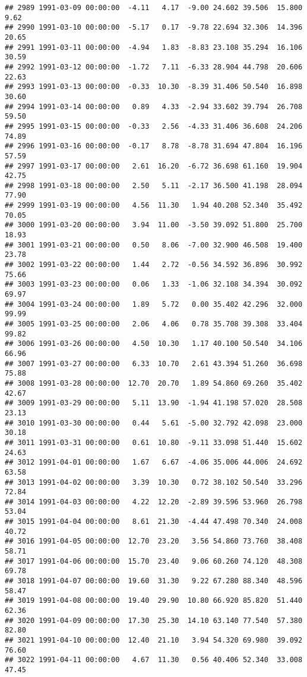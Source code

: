 \documentclass{article}\usepackage{graphicx, color}
\makeatletter
\newenvironment{kframe}{%
 \def\at@end@of@kframe{}%
 \ifinner\ifhmode%
  \def\at@end@of@kframe{\end{minipage}}%
  \begin{minipage}{\columnwidth}%
 \fi\fi%
 \def\FrameCommand##1{\hskip\@totalleftmargin \hskip-\fboxsep
 \colorbox{shadecolor}{##1}\hskip-\fboxsep
     \hskip-\linewidth \hskip-\@totalleftmargin \hskip\columnwidth}%
 \MakeFramed {\advance\hsize-\width
   \@totalleftmargin\z@ \linewidth\hsize
   \@setminipage}}%
 {\par\unskip\endMakeFramed%
 \at@end@of@kframe}
\newenvironment{knitrout}{}{} %
\makeatother
\begin{document}
\begin{knitrout}
\begin{kframe}
\begin{verbatim}
## 2989 1991-03-09 00:00:00  -4.11   4.17  -9.00 24.602 39.506  15.800   9.62
## 2990 1991-03-10 00:00:00  -5.17   0.17  -9.78 22.694 32.306  14.396  20.65
## 2991 1991-03-11 00:00:00  -4.94   1.83  -8.83 23.108 35.294  16.106  30.59
## 2992 1991-03-12 00:00:00  -1.72   7.11  -6.33 28.904 44.798  20.606  22.63
## 2993 1991-03-13 00:00:00  -0.33  10.30  -8.39 31.406 50.540  16.898  30.60
## 2994 1991-03-14 00:00:00   0.89   4.33  -2.94 33.602 39.794  26.708  59.50
## 2995 1991-03-15 00:00:00  -0.33   2.56  -4.33 31.406 36.608  24.206  74.89
## 2996 1991-03-16 00:00:00  -0.17   8.78  -8.78 31.694 47.804  16.196  57.59
## 2997 1991-03-17 00:00:00   2.61  16.20  -6.72 36.698 61.160  19.904  42.75
## 2998 1991-03-18 00:00:00   2.50   5.11  -2.17 36.500 41.198  28.094  77.90
## 2999 1991-03-19 00:00:00   4.56  11.30   1.94 40.208 52.340  35.492  70.05
## 3000 1991-03-20 00:00:00   3.94  11.00  -3.50 39.092 51.800  25.700  18.93
## 3001 1991-03-21 00:00:00   0.50   8.06  -7.00 32.900 46.508  19.400  23.78
## 3002 1991-03-22 00:00:00   1.44   2.72  -0.56 34.592 36.896  30.992  75.66
## 3003 1991-03-23 00:00:00   0.06   1.33  -1.06 32.108 34.394  30.092  69.97
## 3004 1991-03-24 00:00:00   1.89   5.72   0.00 35.402 42.296  32.000  99.99
## 3005 1991-03-25 00:00:00   2.06   4.06   0.78 35.708 39.308  33.404  99.82
## 3006 1991-03-26 00:00:00   4.50  10.30   1.17 40.100 50.540  34.106  66.96
## 3007 1991-03-27 00:00:00   6.33  10.70   2.61 43.394 51.260  36.698  75.88
## 3008 1991-03-28 00:00:00  12.70  20.70   1.89 54.860 69.260  35.402  42.67
## 3009 1991-03-29 00:00:00   5.11  13.90  -1.94 41.198 57.020  28.508  23.13
## 3010 1991-03-30 00:00:00   0.44   5.61  -5.00 32.792 42.098  23.000  30.18
## 3011 1991-03-31 00:00:00   0.61  10.80  -9.11 33.098 51.440  15.602  24.63
## 3012 1991-04-01 00:00:00   1.67   6.67  -4.06 35.006 44.006  24.692  63.58
## 3013 1991-04-02 00:00:00   3.39  10.30   0.72 38.102 50.540  33.296  72.84
## 3014 1991-04-03 00:00:00   4.22  12.20  -2.89 39.596 53.960  26.798  53.04
## 3015 1991-04-04 00:00:00   8.61  21.30  -4.44 47.498 70.340  24.008  40.72
## 3016 1991-04-05 00:00:00  12.70  23.20   3.56 54.860 73.760  38.408  58.71
## 3017 1991-04-06 00:00:00  15.70  23.40   9.06 60.260 74.120  48.308  69.78
## 3018 1991-04-07 00:00:00  19.60  31.30   9.22 67.280 88.340  48.596  58.47
## 3019 1991-04-08 00:00:00  19.40  29.90  10.80 66.920 85.820  51.440  62.36
## 3020 1991-04-09 00:00:00  17.30  25.30  14.10 63.140 77.540  57.380  82.80
## 3021 1991-04-10 00:00:00  12.40  21.10   3.94 54.320 69.980  39.092  76.60
## 3022 1991-04-11 00:00:00   4.67  11.30   0.56 40.406 52.340  33.008  47.45

\end{verbatim}
\end{kframe}
\end{knitrout}
\end{document}
